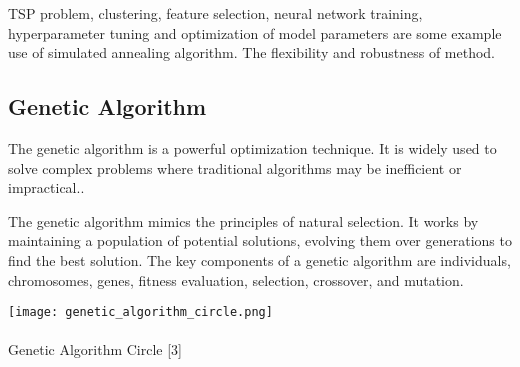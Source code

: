 \documentclass[conference]{IEEEtran}
\begin{document}
TSP problem, clustering, feature selection, neural network training, hyperparameter tuning and optimization of model parameters are some example use of simulated annealing algorithm. The flexibility and robustness of method.


\pagebreak
\subsection{Genetic Algorithm}

The genetic algorithm is a powerful optimization technique. It is widely used to solve complex problems where traditional algorithms may be inefficient or impractical..

The genetic algorithm mimics the principles of natural selection. It works by maintaining a population of potential solutions, evolving them over generations to find the best solution. The key components of a genetic algorithm are individuals, chromosomes, genes, fitness evaluation, selection, crossover, and mutation.
\begin{center}
    \texttt{[image: genetic\_algorithm\_circle.png]}\\ \ \\
    \footnotesize{Genetic Algorithm Circle [3]}
\end{center}\\ 
\begin{figure}[h]
    \centering
    \label{genetic_algorithm_circle}
\end{figure}
\end{document}
